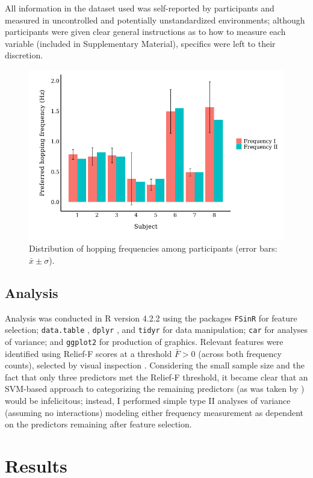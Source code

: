 \documentclass{article}
\begin{document}
All information in the dataset used was self-reported by participants and measured in uncontrolled and potentially unstandardized environments; although participants were given clear general instructions as to how to measure each variable (included in Supplementary Material), specifics were left to their discretion.
\begin{figure}[h!]
	\centering
	\includegraphics[width=0.75\linewidth]{plots/preference.png}
	\caption{Distribution of hopping frequencies among participants (error bars: $\bar x \pm \sigma$).}
	\label{fig:freqplot}
\end{figure}

\subsection{Analysis}
Analysis was conducted in R version 4.2.2 \parencite{r} using the packages \texttt{FSinR} \parencite{fsinr} for feature selection; \texttt{data.table} \parencite{datatable}, \texttt{dplyr} \parencite{dplyr}, and \texttt{tidyr} \parencite{tidyr} for data manipulation; \texttt{car} \parencite{car} for analyses of variance; and \texttt{ggplot2} \parencite{ggplot2} for production of graphics. Relevant features were identified using Relief-F scores at a threshold $\bar F > 0$ (across both frequency counts), selected by visual inspection \parencite{kira1992}. Considering the small sample size and the fact that only three predictors met the Relief-F threshold, it became clear that an SVM-based approach to categorizing the remaining predictors (as was taken by \cite{abut2016}) would be infelicitous; instead, I performed simple type II analyses of variance (assuming no interactions) modeling either frequency measurement as dependent on the predictors remaining after feature selection.

\section{Results}
\end{document}

